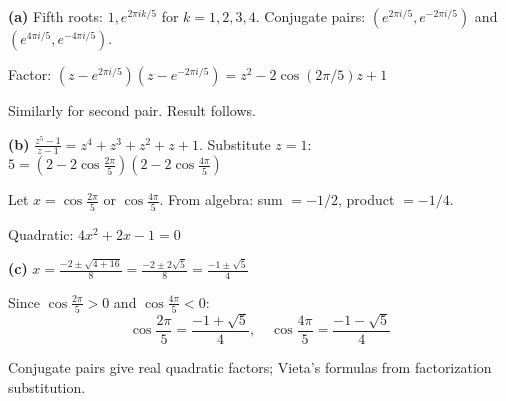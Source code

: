 \begin{solution}
\textbf{(a)} Fifth roots: $1, e^{2\pi ik/5}$ for $k=1,2,3,4$. Conjugate pairs: $(e^{2\pi i/5}, e^{-2\pi i/5})$ and $(e^{4\pi i/5}, e^{-4\pi i/5})$.

Factor: $(z-e^{2\pi i/5})(z-e^{-2\pi i/5}) = z^2 - 2\cos(2\pi/5)z + 1$

Similarly for second pair. Result follows.

\textbf{(b)} $\frac{z^5-1}{z-1} = z^4+z^3+z^2+z+1$. Substitute $z=1$: $5 = (2-2\cos\frac{2\pi}{5})(2-2\cos\frac{4\pi}{5})$

Let $x = \cos\frac{2\pi}{5}$ or $\cos\frac{4\pi}{5}$. From algebra: sum $=-1/2$, product $=-1/4$.

Quadratic: $4x^2+2x-1=0$

\textbf{(c)} $x = \frac{-2\pm\sqrt{4+16}}{8} = \frac{-2\pm 2\sqrt{5}}{8} = \frac{-1\pm\sqrt{5}}{4}$

Since $\cos\frac{2\pi}{5}>0$ and $\cos\frac{4\pi}{5}<0$:
$$
\cos\frac{2\pi}{5} = \frac{-1+\sqrt{5}}{4}, \quad \cos\frac{4\pi}{5} = \frac{-1-\sqrt{5}}{4}
$$

\end{solution}

\begin{takeaways}
Conjugate pairs give real quadratic factors; Vieta's formulas from factorization substitution.
\end{takeaways}

\vspace{1cm}
